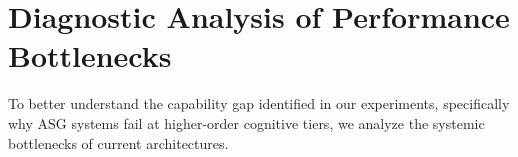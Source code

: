 \documentclass[11pt]{article}
\begin{document}

\section{Diagnostic Analysis of Performance Bottlenecks}
\label{sec:appendix_root_cause}

To better understand the capability gap identified in our experiments, specifically why ASG systems fail at higher-order cognitive tiers, we analyze the systemic bottlenecks of current architectures. 
\end{document}
